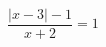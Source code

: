 \begin{ex}[type=equation]
	\begin{condition}
		$\dfrac{\big|x - 3\big| - 1}{x + 2} = 1$
	\end{condition}
\end{ex}